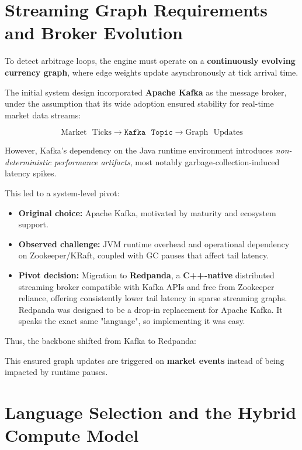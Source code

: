 \documentclass[letterpaper,11pt]{report}
\begin{document}
\section{Streaming Graph Requirements and Broker Evolution}

To detect arbitrage loops, the engine must operate on a \textbf{continuously evolving currency graph}, where edge weights update asynchronously at tick arrival time.


The initial system design incorporated \textbf{Apache Kafka} as the message broker, under the assumption that its wide adoption ensured stability for real-time market data streams:

\begin{equation}
\text{Market ~Ticks} \rightarrow \texttt{Kafka ~Topic} \rightarrow \text{Graph ~Updates}
\end{equation}

However, Kafka’s dependency on the Java runtime environment introduces \emph{non-deterministic performance artifacts}, most notably garbage-collection-induced latency spikes.

This led to a system-level pivot:

\begin{itemize}
    \item \textbf{Original choice:} Apache Kafka, motivated by maturity and ecosystem support.
    \item \textbf{Observed challenge:} JVM runtime overhead and operational dependency on Zookeeper/KRaft, coupled with GC pauses that affect tail latency.
    \item \textbf{Pivot decision:} Migration to \textbf{Redpanda}, a \textbf{C++-native} distributed streaming broker compatible with Kafka APIs and free from Zookeeper reliance, offering consistently lower tail latency in sparse streaming graphs. Redpanda was designed to be a drop-in replacement for Apache Kafka. It speaks the exact same "language", so implementing it was easy.
\end{itemize}

Thus, the backbone shifted from Kafka to Redpanda:


This ensured graph updates are triggered on \textbf{market events} instead of being impacted by runtime pauses.



\section{Language Selection and the Hybrid Compute Model}
\end{document}

